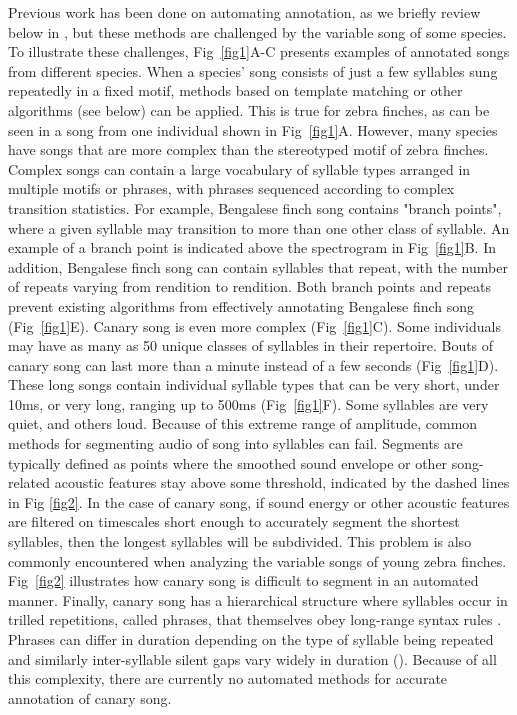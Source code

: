 \documentclass[10pt,letterpaper]{article}
\begin{document}
Previous work has been done on automating annotation, 
as we briefly review below in ,
but these methods are challenged by the variable song of some species.
To illustrate these challenges,  Fig~\ref{fig1}A-C presents examples of annotated songs from different species.
When a species' song consists of just a few syllables sung repeatedly in a fixed motif, methods based on template matching or 
other algorithms (see  below) can be applied.
This is true for zebra finches, as can be seen in a song from one individual shown in Fig~\ref{fig1}A.
However, many species have songs that are more complex than the stereotyped motif of zebra finches.
Complex songs can contain a large vocabulary of syllable types arranged in multiple motifs or phrases, 
with phrases sequenced according to complex transition statistics. For example, Bengalese
finch song contains "branch points", where a given syllable may transition to more than one other class of
syllable. An example of a branch point is indicated above the spectrogram in Fig~\ref{fig1}B. In addition,
Bengalese finch song can contain syllables that repeat, with the number of repeats varying from rendition to
rendition. Both branch points and repeats prevent existing algorithms from effectively annotating Bengalese
finch song (Fig~\ref{fig1}E). Canary song is even more complex (Fig~\ref{fig1}C). Some individuals may have as many as 50 unique classes of syllables in their repertoire. Bouts of canary song can last more than a minute instead of a few seconds (Fig~\ref{fig1}D). These long songs contain individual syllable types that  can be very short, under 10ms, or very long, ranging up to 500ms (Fig~\ref{fig1}F). Some syllables are very quiet, and others loud.
Because of this extreme range of amplitude, common methods for segmenting audio of song into syllables can fail.
Segments are typically defined as points where the smoothed sound envelope or other song-related acoustic features \cite{tchernichovski_procedure_2000} stay above some threshold, indicated by the dashed lines in Fig \ref{fig2}. In the case of canary song, if sound energy or other acoustic features are filtered on timescales short enough to accurately segment the shortest syllables, then the longest syllables will be subdivided. This problem is also commonly encountered when analyzing the variable songs of young zebra finches. 
Fig~\ref{fig2} illustrates how canary song is difficult to segment in an automated manner. 
Finally, canary song has a hierarchical structure where syllables occur in trilled repetitions, called phrases, that themselves obey long-range syntax rules \cite{markowitz_long-range_2013,gardner_freedom_2005}. Phrases can differ in duration depending on the type of syllable being repeated and similarly inter-syllable silent gaps vary widely in duration (). Because of all this complexity, there are currently no automated methods for accurate annotation of canary song.
\end{document}
